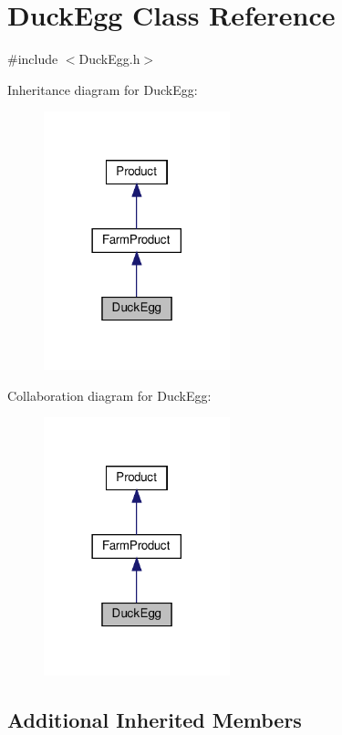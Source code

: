 \hypertarget{classDuckEgg}{}\section{Duck\+Egg Class Reference}
\label{classDuckEgg}


{\ttfamily \#include $<$Duck\+Egg.\+h$>$}



Inheritance diagram for Duck\+Egg\+:
\nopagebreak
\begin{figure}[H]
\begin{center}
\leavevmode
\includegraphics[width=153pt]{classDuckEgg__inherit__graph}
\end{center}
\end{figure}


Collaboration diagram for Duck\+Egg\+:
\nopagebreak
\begin{figure}[H]
\begin{center}
\leavevmode
\includegraphics[width=153pt]{classDuckEgg__coll__graph}
\end{center}
\end{figure}
\subsection*{Additional Inherited Members}


